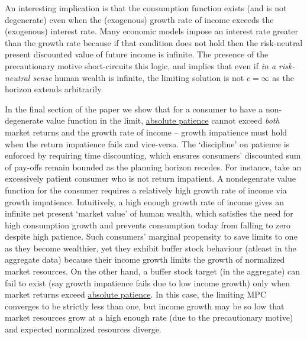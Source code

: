 \documentclass[BufferStockTheory]{subfiles}
\begin{document}
%

\begin{comment}
The benchmark `well-behaved' consumer satisfies both growth impatience and return impatience. At the same time neither return impatience nor growth impatience are necessary for a non-degenerate limiting solution. However, i
\end{comment}

An interesting implication is that the consumption function exists (and is not degenerate) even when the (exogenous) growth rate of income exceeds the (exogenous) interest rate.  Many economic models impose an interest rate greater than the growth rate because if that condition does not hold then the risk-neutral present discounted value of future income is infinite.  The presence of the precautionary motive short-circuits this logic, and implies that even if \textit{in a risk-neutral sense} human wealth is infinite, the limiting solution is not $c = \infty$ as the horizon extends arbitrarily.

In the final section of the paper we show that for a consumer to have a non-degenerate value function in the limit, \hyperlink{APF}{absolute patience} cannot exceed \textit{both} market returns and the growth rate of income -- growth impatience must hold when the return impatience fails and vice-versa. The `discipline' on patience is enforced by requiring time discounting, which ensures consumers' discounted sum of pay-offs remain bounded as the planning horizon recedes. For instance, take an excessively patient consumer who is not return impatient. A nondegenrate value function for the consumer requires a relatively high growth rate of income via growth impatience. Intuitively, a high enough growth rate of income gives an infinite net present `market value' of human wealth, which satisfies the need for high consumption growth and prevents consumption today from falling to zero despite high patience. Such consumers' marginal propensity to save limits to one as they become wealthier, yet they exhibit buffer stock behaviour (atleast in the aggregate data) because their income growth limits the growth of normalized market resources. On the other hand, a buffer stock target (in the aggregate) can fail to exist  (say growth impatience fails due to low income growth) only when market returns exceed \hyperlink{APF}{absolute patience}. In this case, the limiting MPC converges to be strictly less than one, but income growth may be so low that market resources grow at a high enough rate (due to the precautionary motive) and expected normalized resources diverge.  
\end{document}
